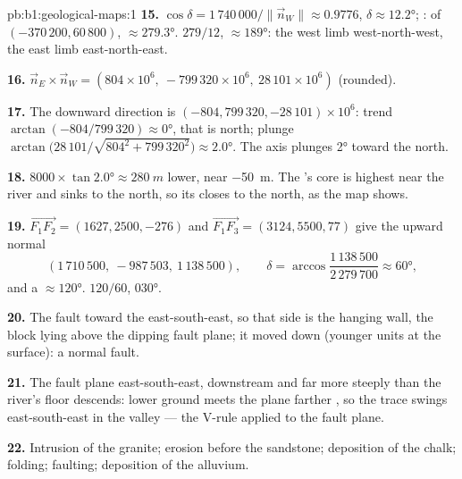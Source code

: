 \begin{solution}{pb:b1:geological-maps:1}
\textbf{15.} $\cos\delta = 1\,740\,000/\|\vec n_W\| \approx 0.9776$, $\delta
\approx \ang{12.2}$; :  of $(-370\,200, 60\,800)$,
$\approx \ang{279.3}$.  $279/12$,  $\approx \ang{189}$: the west
limb  west-north-west, the east limb east-north-east.

\textbf{16.} $\vec n_E \times \vec n_W = (804 \times 10^6,\ -799\,320 \times
10^6,\ 28\,101 \times 10^6)$ (rounded).

\textbf{17.} The downward direction is $(-804, 799\,320, -28\,101) \times
10^6$: trend $\arctan(-804/799\,320) \approx \ang{0}$, that is north; plunge
$\arctan\bigl(28\,101/\sqrt{804^2 + 799\,320^2}\bigr) \approx \ang{2.0}$. The
axis plunges \ang{2} toward the north.

\textbf{18.} $8000 \times \tan\ang{2.0} \approx \qty{280}{m}$ lower, near
\qty{-50}{m}. The 's core is highest near the river and sinks to
the north, so its  closes to the north, as the map shows.

\textbf{19.} $\overrightarrow{F_1F_2} = (1627, 2500, -276)$ and
$\overrightarrow{F_1F_3} = (3124, 5500, 77)$ give the upward normal
\[
  (1\,710\,500,\ -987\,503,\ 1\,138\,500), \qquad
  \delta = \arccos\frac{1\,138\,500}{2\,279\,700} \approx \ang{60},
\]
and a  $\approx \ang{120}$.  $120/60$, 
\ang{030}.

\textbf{20.} The fault  toward the east-south-east, so that side is the
hanging wall, the block lying above the dipping fault plane; it moved down (younger units at the surface): a normal fault.

\textbf{21.} The fault plane  east-south-east, downstream and far more
steeply than the river's floor descends: lower ground meets the plane
farther , so the trace swings east-south-east in the valley --- the
V-rule applied to the fault plane.

\textbf{22.} Intrusion of the granite; erosion before the sandstone;
deposition of the chalk; folding; faulting; deposition of the alluvium.


\end{solution}
